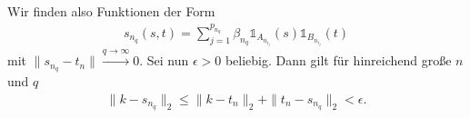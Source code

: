 \begin{solution}
\begin{enumerate}[label = (\alph*)]
Wir finden also Funktionen der Form
\begin{align}
    s_{n_q} (s,t) = \sum_{j=1}^{p_{n_q}} \beta_{n_q} \mathds{1}_{A_{n_{i_j}}}(s) \mathds{1}_{B_{n_{i_j}}}(t)
\end{align}
mit $\|s_{n_q} - t_n\| \xrightarrow{q \rightarrow \infty} 0.$
Sei nun $\epsilon > 0$ beliebig. Dann gilt für hinreichend große $n$ und $q$
\begin{align}
    \| k-s_{n_q} \|_2 \leq \|k - t_n\|_2 + \|t_n - s_{n_q}\|_2 < \epsilon.
\end{align}

\end{enumerate}

\end{solution}
